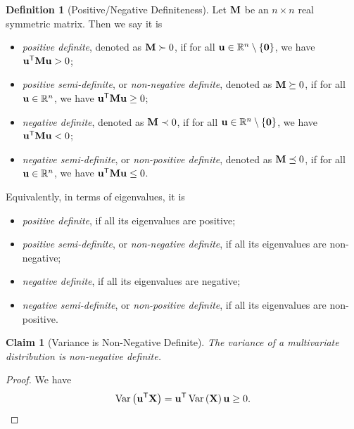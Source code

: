 \documentclass{article}
\newtheorem{claim}[theorem]{Claim}
\theoremstyle{definition}
\newtheorem{definition}[theorem]{Definition}
\theoremstyle{remark}
\newcommand{\RR}{\mathbb{R}}
\newcommand{\transpose}{^{\mathsf{T}}}
\newcommand{\posDef}{\succ}
\newcommand{\posDefEq}{\succeq}
\newcommand{\negDef}{\prec}\newcommand{\negDefEq}{\preceq}
\newcommand{\Var}{\operatorname{Var}}
\begin{document}
\begin{definition}[Positive/Negative Definiteness]
    \label{def:positive-negative-definiteness}%
    Let \(\vb{M}\) be an \(n \times n\) real symmetric matrix. Then we say it is
    \begin{itemize}
        \item \emph{positive definite}, denoted as \(\vb{M} \posDef 0\), if for all \(\vb{u} \in \RR^n \setminus \Bqty{\vb{0}}\), we have \(\vb{u}\transpose \vb{M} \vb{u} > 0\);
        \item \emph{positive semi-definite}, or \emph{non-negative definite}, denoted as \(\vb{M} \posDefEq 0\), if for all \(\vb{u} \in \RR^n\), we have \(\vb{u} \transpose \vb{M} \vb{u} \geq 0\);
        \item \emph{negative definite}, denoted as \(\vb{M} \negDef 0\), if for all \(\vb{u} \in \RR^n \setminus \Bqty{\vb{0}}\), we have \(\vb{u}\transpose \vb{M} \vb{u} < 0\);
        \item \emph{negative semi-definite}, or \emph{non-positive definite}, denoted as \(\vb{M} \negDefEq 0\), if for all \(\vb{u} \in \RR^n\), we have \(\vb{u} \transpose \vb{M} \vb{u} \leq 0\).
    \end{itemize}

    Equivalently, in terms of eigenvalues, it is
    \begin{itemize}
        \item \emph{positive definite}, if all its eigenvalues are positive;
        \item \emph{positive semi-definite}, or \emph{non-negative definite}, if all its eigenvalues are non-negative;
        \item \emph{negative definite}, if all its eigenvalues are negative;
        \item \emph{negative semi-definite}, or \emph{non-positive definite}, if all its eigenvalues are non-positive.
    \end{itemize}
\end{definition}

\begin{claim}[Variance is Non-Negative Definite]
    \label{claim:variance-non-negative-definite}%
    The variance of a multivariate distribution is non-negative definite.
\end{claim}

\begin{proof}
    We have
    \[
        \Var\pqty{\vb{u}\transpose \vb{X}} = \vb{u}\transpose \Var\pqty{\vb{X}} \vb{u} \geq 0.
    \]
\end{proof}
\end{document}
